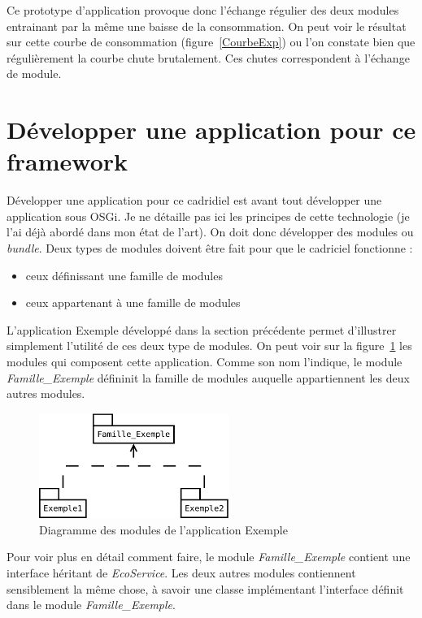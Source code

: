 \documentclass[a4paper, 11pt]{report}
\begin{document}
Ce prototype d'application provoque donc l'échange régulier des deux modules entrainant par la même une baisse de la consommation. On peut voir le résultat sur cette courbe de consommation (figure~\ref{CourbeExp}) ou l'on constate bien que régulièrement la courbe chute brutalement. Ces chutes correspondent à l'échange de module.

	\section{Développer une application pour ce framework}
Développer une application pour ce cadridiel est avant tout développer une application sous OSGi. Je ne détaille pas ici les principes de cette technologie (je l'ai déjà abordé dans mon état de l'art). On doit donc développer des modules ou \textit{bundle}. Deux types de modules doivent être fait pour que le cadriciel fonctionne :
\begin{itemize}
  \item ceux définissant une famille de modules
  \item ceux appartenant à une famille de modules
\end{itemize}

L'application Exemple développé dans la section précédente permet d'illustrer simplement l'utilité de ces deux type de modules. On peut voir sur la figure~\ref{BdlExp} les modules qui composent cette application. Comme son nom l'indique, le module \textit{Famille\_Exemple} défininit la famille de modules auquelle appartiennent les deux autres modules.

\begin{figure}
	\centering
	\includegraphics[width=0.55\textwidth]{figures/EcoPattern_Exemple}
	\caption{Diagramme des modules de l'application Exemple}
	\label{BdlExp}
\end{figure}

Pour voir plus en détail comment faire, le module \textit{Famille\_Exemple} contient une interface héritant de \textit{EcoService}. Les deux autres modules contiennent sensiblement la même chose, à savoir une classe implémentant l'interface définit dans le module \textit{Famille\_Exemple}.
\end{document}
